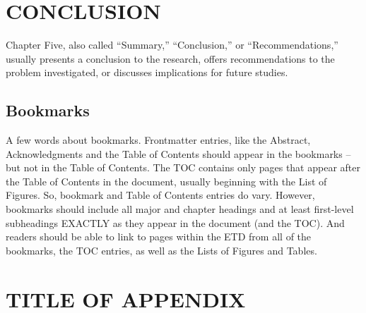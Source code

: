 \documentclass{UCF_ETD}
\begin{document}
\chapter{CONCLUSION}
Chapter Five, also called ``Summary,'' ``Conclusion,'' or ``Recommendations,'' usually presents a conclusion to the research, offers recommendations to the problem investigated, or discusses implications for future studies.

\section{Bookmarks}
A few words about bookmarks. Frontmatter entries, like the Abstract, Acknowledgments and the Table of Contents should appear in the bookmarks – but not in the Table of Contents. The TOC contains only pages that appear after the Table of Contents in the document, usually beginning with the List of Figures. So, bookmark and Table of Contents entries do vary.
However, bookmarks should include all major and chapter headings and at least first-level subheadings EXACTLY as they appear in the document (and the TOC). And readers should be able to link to pages within the ETD from all of the bookmarks, the TOC entries, as well as the Lists of Figures and Tables.

\appendix

\chapter{TITLE OF APPENDIX}
\newpage





\noindent{}\\
\\
\\
\\
\\
\\
\end{document}
